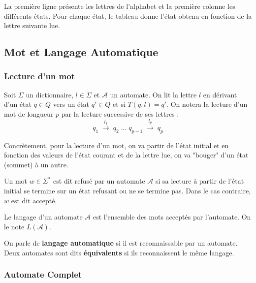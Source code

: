 \begin{example}
\begin{multicols}{2}
        La première ligne présente les lettres de l'alphabet et la première colonne les différents états. 
        Pour chaque état, le tableau donne l'état obtenu en fonction de la lettre suivante lue. 
    \end{multicols}
\end{example}

\subsection{Mot et Langage Automatique}

\subsubsection{Lecture d'un mot}

\begin{definition}
    Soit $\Sigma$ un dictionnaire, $l \in \Sigma$ et $\mathcal{A}$ un automate. 
    On lit la lettre $l$ en dérivant d'un état $q \in Q$ vers un état $q' \in Q$ et si $T(q,l) = q'$. 
    On notera la lecture d'un mot de longueur $p$ par la lecture successive de ses lettres :
        \[ q_1 \;  \overset{l_1}{\longrightarrow} \; q_2 \; \dots \; q_{p-1} \; \overset{l_p}{\longrightarrow} \; q_p \] 
\end{definition}

Concrètement, pour la lecture d'un mot, on va partir de l'état initial et en fonction des valeurs de l'état courant et de 
la lettre lue, on va "bouger" d'un état (sommet) à un autre.

\begin{definition}
    Un mot $w \in \Sigma^*$ est dit refusé par un automate $\mathcal{A}$ si sa lecture à partir de l'état initial 
    se termine sur un état refusant ou ne se termine pas. Dans le cas contraire, $w$ est dit accepté. 
\end{definition}

\begin{definition}
    Le langage d'un automate $\mathcal{A}$ est l'ensemble des mots acceptés par l'automate. 
    On le note $L(\mathcal{A})$. 
\end{definition}

On parle de \textbf{langage automatique} si il est reconnaissable par un automate. 
Deux automates sont dits \textbf{équivalents} si ils reconnaissent le même langage. 

\subsubsection{Automate Complet}

